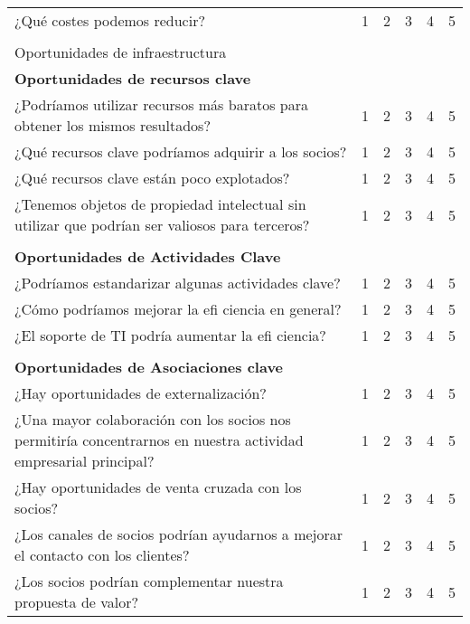 \documentclass[11pt]{book}
\begin{document}
\begin{table}[htbp]
\begin{tabular}{p{27.93em}rrrrr}
    ¿Qué costes podemos reducir? & 1     & 2     & 3     & 4     & 5 \\
    \multicolumn{1}{l}{} &       &       &       &       &  \\
    \textcolor[rgb]{ 1,  0,  0}{Oportunidades de infraestructura} &       &       &       &       &  \\
    \textbf{Oportunidades de recursos clave} &       &       &       &       &  \\
    ¿Podríamos utilizar recursos más baratos para obtener los mismos resultados? & 1     & 2     & 3     & 4     & 5 \\
    ¿Qué recursos clave podríamos adquirir a los socios? & 1     & 2     & 3     & 4     & 5 \\
    ¿Qué recursos clave están poco explotados? & 1     & 2     & 3     & 4     & 5 \\
    ¿Tenemos objetos de propiedad intelectual sin utilizar que podrían ser valiosos para terceros? & 1     & 2     & 3     & 4     & 5 \\
    \multicolumn{1}{l}{} &       &       &       &       &  \\
    \textbf{Oportunidades de Actividades Clave} &       &       &       &       &  \\
    ¿Podríamos estandarizar algunas actividades clave? & 1     & 2     & 3     & 4     & 5 \\
    ¿Cómo podríamos mejorar la efi ciencia en general? & 1     & 2     & 3     & 4     & 5 \\
    ¿El soporte de TI podría aumentar la efi ciencia? & 1     & 2     & 3     & 4     & 5 \\
    \multicolumn{1}{l}{} &       &       &       &       &  \\
    \textbf{Oportunidades de Asociaciones clave} &       &       &       &       &  \\
    ¿Hay oportunidades de externalización? & 1     & 2     & 3     & 4     & 5 \\
    ¿Una mayor colaboración con los socios nos permitiría concentrarnos en nuestra actividad empresarial principal? & 1     & 2     & 3     & 4     & 5 \\
    ¿Hay oportunidades de venta cruzada con los socios? & 1     & 2     & 3     & 4     & 5 \\
    ¿Los canales de socios podrían ayudarnos a mejorar el contacto con los clientes? & 1     & 2     & 3     & 4     & 5 \\
    ¿Los socios podrían complementar nuestra propuesta de valor? & 1     & 2     & 3     & 4     & 5 \\
    \end{tabular}%
  \label{tab:addlabel}%
\end{table}%
\end{document}
